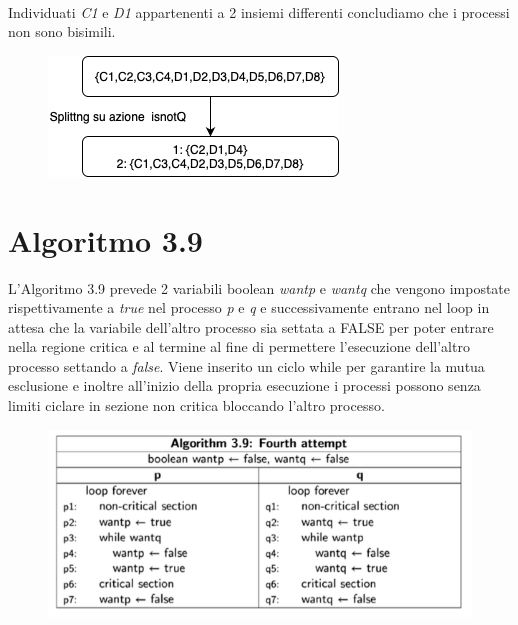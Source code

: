 \documentclass{article}
\begin{document}
\\Individuati \textit{C1} e \textit{D1} appartenenti a 2 insiemi differenti concludiamo che i processi non sono bisimili.
\begin{figure}[h] 
\centering
\includegraphics[scale=0.5]{Untitled Diagram-5.png}
\end{figure}
\clearpage
\section{Algoritmo 3.9}
L'Algoritmo 3.9 prevede 2 variabili boolean \textit{wantp} e \textit{wantq} che vengono impostate rispettivamente a \textit{true} nel processo \textit{p} e \textit{q} e successivamente entrano nel loop in attesa che la variabile dell'altro processo sia settata a FALSE per poter entrare nella regione critica e al termine al fine di permettere l'esecuzione dell'altro processo settando a \textit{false}. Viene inserito un ciclo while per garantire la mutua esclusione e inoltre all'inizio della propria esecuzione i processi possono senza limiti ciclare in sezione non critica bloccando l'altro processo. 
\begin{figure}[h] 
\centering
\includegraphics[scale=0.6]{3.9.png}
\end{figure}
\clearpage
\end{document}
